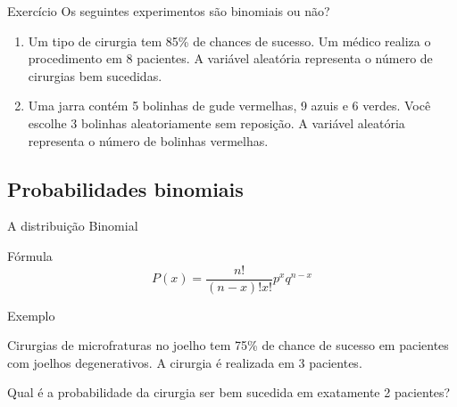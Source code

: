 \documentclass{beamer}
\begin{document}
\begin{frame}{Exercício}
Os seguintes experimentos são binomiais ou não?
  \begin{block}{}
    \begin{enumerate}
    \item Um tipo de cirurgia tem 85\% de chances de sucesso.
      Um médico realiza o procedimento em 8 pacientes.
      A variável aleatória representa o número de cirurgias bem sucedidas.
    \item Uma jarra contém 5 bolinhas de gude vermelhas, 9 azuis e 6 verdes.
      Você escolhe 3 bolinhas aleatoriamente sem reposição.
      A variável aleatória representa o número de bolinhas vermelhas.
    \end{enumerate}
  \end{block}
\end{frame}

\subsection{Probabilidades binomiais}

\begin{frame}{A distribuição Binomial}
  \begin{block}{Fórmula}
    \begin{displaymath}
      P(x) = \frac{n!}{(n-x)!x!}p^x q^{n-x}
    \end{displaymath}
  \end{block}
\end{frame}

\begin{frame}{Exemplo}
  \begin{example}
    Cirurgias de microfraturas no joelho tem 75\% de chance de sucesso em pacientes com joelhos degenerativos.
    A cirurgia é realizada em 3 pacientes.

    \bigskip
    Qual é a probabilidade da cirurgia ser bem sucedida em exatamente 2 pacientes?
  \end{example}
\end{frame}
\end{document}
